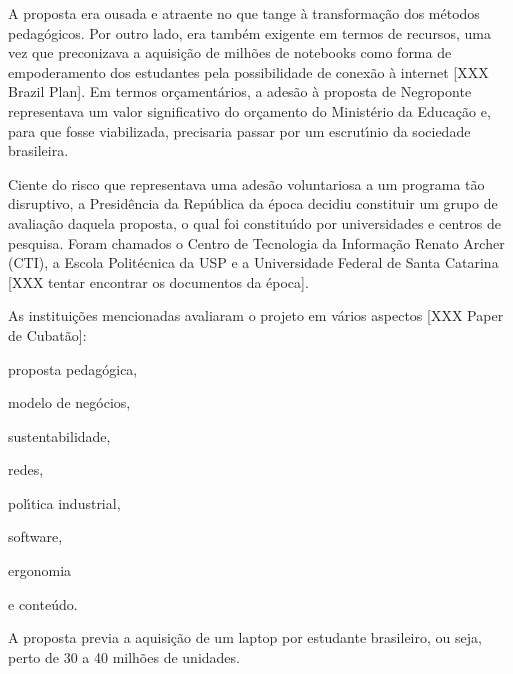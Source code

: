 \documentclass[
12pt,		%
openright,	%
twoside,  %
a4paper,			%
chapter=TITLE,		%
english,			%
french,				%
spanish,			%
brazil				%
]{USPSC-classe/USPSC_RedarTex}
\begin{document}
A proposta era ousada e atraente no que tange \`a transforma\c{c}\~ao dos m\'etodos pedag\'ogicos. Por outro lado, era tamb\'em exigente em termos de recursos, uma vez que preconizava a aquisi\c{c}\~ao de milh\~oes de notebooks como forma de empoderamento dos estudantes pela possibilidade de conex\~ao \`a internet [XXX Brazil Plan]. Em termos or\c{c}ament\'arios, a ades\~ao \`a proposta de Negroponte representava um valor significativo do or\c{c}amento do Minist\'erio da Educa\c{c}\~ao e, para que fosse viabilizada, precisaria passar por um escrut\'{\i}nio da sociedade brasileira.










Ciente do risco que representava uma ades\~ao voluntariosa a um programa t\~ao disruptivo, a Presid\^encia da Rep\'ublica da \'epoca decidiu constituir um grupo de avalia\c{c}\~ao  daquela proposta, o  qual foi constitu\'{\i}do por universidades e centros de pesquisa. Foram chamados o Centro de Tecnologia da Informa\c{c}\~ao Renato Archer (CTI), a Escola Polit\'ecnica da USP e a Universidade Federal de Santa Catarina [XXX tentar encontrar os documentos da \'epoca]. 










As institui\c{c}\~oes mencionadas avaliaram o projeto em v\'arios aspectos [XXX Paper de Cubat\~ao]:











\begin{alineas}
\item proposta pedag\'ogica,
\item modelo de neg\'ocios,
\item sustentabilidade,
\item redes,
\item pol\'{\i}tica industrial,
\item software,
\item ergonomia
\item e conte\'udo.
\end{alineas}

A proposta previa a aquisi\c{c}\~ao de um \textquotedbl laptop por estudante brasileiro, ou seja, perto de 30 a 40 milh\~oes de unidades.
\end{document}
